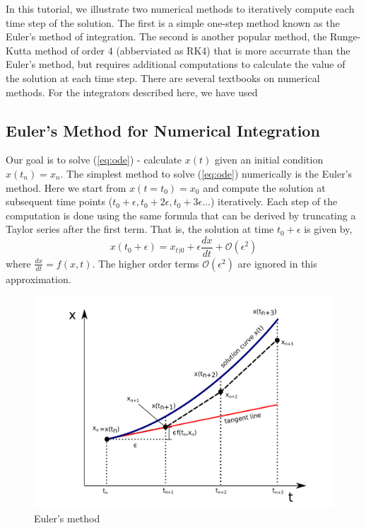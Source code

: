 \documentclass[10pt,letterpaper]{article}
\begin{document}
In this tutorial, we illustrate two numerical methods to iteratively compute each time step of the solution. The first is a simple one-step method known as the Euler's method of integration. The second is another popular method, the Runge-Kutta method of order 4 (abberviated as RK4) that is more accurrate than the Euler's method, but requires additional computations to calculate the value of the solution at each time step. There are several textbooks on numerical methods. For the integrators described here, we have used~\cite{kreyszig1983}

\subsection*{Euler's Method for Numerical Integration}
Our goal is to solve (\ref{eq:ode}) - calculate $x(t)$ given an initial condition $x(t_n)=x_{n}$. The simplest method to solve (\ref{eq:ode}) numerically is the Euler's method. Here we start from $x(t=t_{0})=x_{0}$ and compute the solution at subsequent time points ($t_{0}+\epsilon,t_{0}+2\epsilon,t_{0}+3\epsilon \dots $) iteratively. Each step of the computation is done using the same formula that can be derived by truncating a Taylor series after the first term. That is, the solution at time $t_{0}+\epsilon$ is given by,
\begin{equation}
x(t_{0}+\epsilon) = x_{t){0}} + \epsilon\frac{dx}{dt} + \mathcal{O}(\epsilon^2)
\label{eq:euler}
\end{equation}
where $\frac{dx}{dt}=f(x,t)$. The higher order terms $\mathcal{O}(\epsilon^2)$ are ignored in this approximation. 

\begin{figure}[H]
\includegraphics[scale=0.4]{Figures/fig1.pdf} 
\caption{Euler's method}
\label{fig:euler}
\end{figure}
\end{document}
